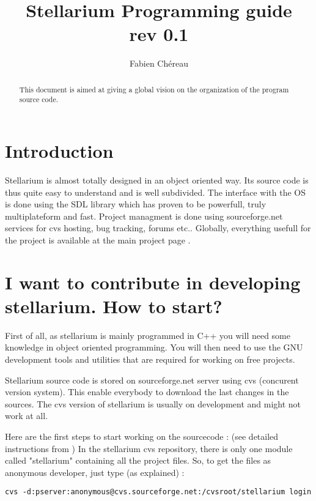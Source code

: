 \documentclass[11pt,oneside] {article}
\begin{document}
\title{\textbf{Stellarium Programming guide} \\{rev 0.1}}
\author{Fabien Ch\'ereau}

\maketitle

\begin{abstract}
This document is aimed at giving a global vision on the organization of the program source code.
\end{abstract}

\section{Introduction}
Stellarium is almost totally designed in an object oriented way. Its source code is thus quite easy to understand and is well subdivided.
The interface with the OS is done using the SDL library which has proven to be powerfull, truly multiplateform and fast.
Project managment is done using sourceforge.net services for cvs hosting, bug tracking, forums etc.. Globally, everything usefull for the project is available at the main project page .

\section{I want to contribute in developing stellarium. How to start?}
First of all, as stellarium is mainly programmed in C++ you will need some knowledge in object oriented programming.
You will then need to use the GNU development tools and utilities that are required for working on free projects.

Stellarium source code is stored on sourceforge.net server using cvs (concurent version system). This enable everybody to download the last changes in the sources. The cvs version of stellarium is usually on development and might not work at all.


Here are the first steps to start working on the sourcecode : (see detailed instructions from )
In the stellarium cvs repository, there is only one module called "stellarium"
containing all the project files. So, to get the files as anonymous developer, just type (as explained) :

{\tt cvs -d:pserver:anonymous@cvs.sourceforge.net:/cvsroot/stellarium login}
\end{document}

